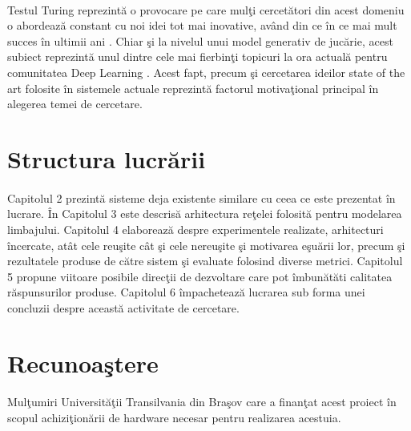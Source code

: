 \paragraph{}
Testul Turing reprezint\u a o provocare pe care mul\c ti cercet\u atori din acest domeniu o abordeaz\u a constant cu noi idei tot mai inovative, av\^ and din ce \^ in ce mai mult succes \^ in ultimii ani \cite{turing-test-succes}. Chiar \c si la nivelul unui model generativ de juc\u arie, acest subiect reprezint\u a unul dintre cele mai fierbin\c ti topicuri la ora actual\u a pentru comunitatea Deep Learning \cite{deep-learning-turing-test}. Acest fapt, precum \c si cercetarea ideilor state of the art folosite \^ in sistemele actuale reprezint\u a factorul motiva\c tional principal \^ in alegerea temei de cercetare.

\section{Structura lucr\u arii}

\paragraph{}
Capitolul 2 prezint\u a sisteme deja existente similare cu ceea ce este prezentat \^ in lucrare. \^ In Capitolul 3 este descris\u a arhitectura re\c telei folosit\u a pentru modelarea limbajului. Capitolul 4 elaboreaz\u a despre experimentele realizate, arhitecturi \^ incercate, at\^ at cele reu\c site c\^ at \c si cele nereu\c site \c si motivarea e\c su\u arii lor, precum \c si rezultatele produse de c\u atre sistem \c si evaluate folosind diverse metrici. Capitolul 5 propune viitoare posibile direc\c tii de dezvoltare care pot \^ imbun\u at\u ati calitatea r\u aspunsurilor produse. Capitolul 6 \^ impacheteaz\u a lucrarea sub forma unei concluzii despre aceast\u a activitate de cercetare.


\section{Recunoa\c stere}

\paragraph{}
Mul\c tumiri Universit\u a\c tii Transilvania din Bra\c sov care a finan\c tat acest proiect \^ in scopul achizi\c tion\u arii de hardware necesar pentru realizarea acestuia.